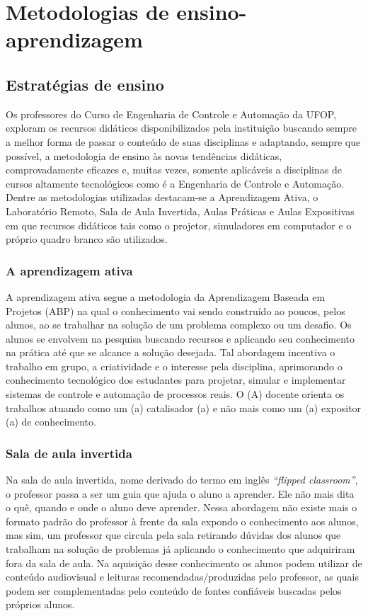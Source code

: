 \chapter{Metodologias de ensino-aprendizagem} 
\label{cap:05} 
\section{Estratégias de ensino}
Os professores do Curso de Engenharia de Controle e Automação da UFOP, exploram os recursos didáticos disponibilizados pela instituição buscando sempre a melhor forma de passar o conteúdo de suas disciplinas e adaptando, sempre que possível, a metodologia de ensino às novas tendências didáticas, comprovadamente eficazes e, muitas vezes, somente aplicáveis a disciplinas de cursos  altamente tecnológicos como é a Engenharia de Controle e Automação. Dentre as metodologias utilizadas destacam-se a Aprendizagem Ativa, o Laboratório Remoto, Sala de Aula Invertida, Aulas Práticas e Aulas Expositivas em que recursos didáticos tais como o projetor, simuladores em computador e o próprio quadro branco são utilizados.

\subsection*{A aprendizagem ativa}   

A aprendizagem ativa segue a metodologia da Aprendizagem Baseada em Projetos (ABP) na qual o conhecimento vai sendo construído ao poucos, pelos alunos, ao se trabalhar na solução de um problema complexo ou um desafio. Os alunos se envolvem na pesquisa buscando recursos e aplicando seu conhecimento na prática até que se alcance a solução desejada. Tal abordagem incentiva o trabalho em grupo, a criatividade e o interesse pela disciplina, aprimorando o conhecimento tecnológico dos estudantes para projetar, simular e implementar sistemas de controle e automação de processos reais. O (A) docente orienta os trabalhos atuando como um (a) catalisador (a) e não mais como um (a) expositor (a) de conhecimento. 

\subsection*{Sala de aula invertida}
%
Na sala de aula invertida, nome derivado do termo em inglês \textit{``flipped classroom''}, o professor passa a ser um guia que ajuda o aluno a aprender. Ele não mais dita o quê, quando e onde o aluno deve aprender. Nessa abordagem não existe mais o formato padrão do professor à frente da sala expondo o conhecimento aos alunos, mas sim, um professor que circula pela sala retirando dúvidas dos alunos que trabalham na solução de problemas já aplicando o conhecimento que adquiriram fora da sala de aula. Na aquisição desse conhecimento os alunos podem utilizar de conteúdo audiovisual e leituras recomendadas/produzidas pelo professor, as quais podem ser complementadas pelo conteúdo de fontes confiáveis buscadas pelos próprios alunos.

